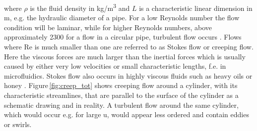 where $\rho$ is the fluid density in kg/m\textsuperscript{3} and $L$ is a characteristic linear dimension in m, e.g. the hydraulic diameter of a pipe. For a low Reynolds number the flow condition will be laminar, while for higher Reynolds numbers, above approximately 2300 for a flow in a circular pipe, turbulent flow occurs \cite{schwarze2012cfd}. Flows where Re is much smaller than one are referred to as Stokes flow or creeping flow. Here the viscous forces are much larger than the inertial forces which is usually caused by either very low velocities or small characteristic lengths, f.e. in microfluidics. Stokes flow also occurs in highly viscous fluids such as heavy oils or honey \cite{lautrup2004physics}. Figure\,\ref{fig:creep_tot} shows creeping flow around a cylinder, with its characteristic streamlines, that are parallel to the surface of the cylinder as a schematic drawing and in reality. A turbulent flow around the same cylinder, which would occur e.g. for large u, would appear less ordered and contain eddies or swirls.

